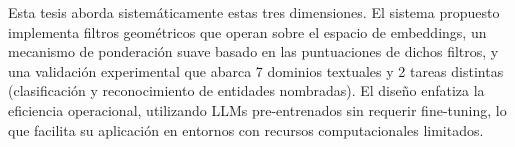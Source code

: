 Esta tesis aborda sistemáticamente estas tres dimensiones. El sistema propuesto implementa filtros geométricos que operan sobre el espacio de embeddings, un mecanismo de ponderación suave basado en las puntuaciones de dichos filtros, y una validación experimental que abarca 7 dominios textuales y 2 tareas distintas (clasificación y reconocimiento de entidades nombradas). El diseño enfatiza la eficiencia operacional, utilizando LLMs pre-entrenados sin requerir fine-tuning, lo que facilita su aplicación en entornos con recursos computacionales limitados.
